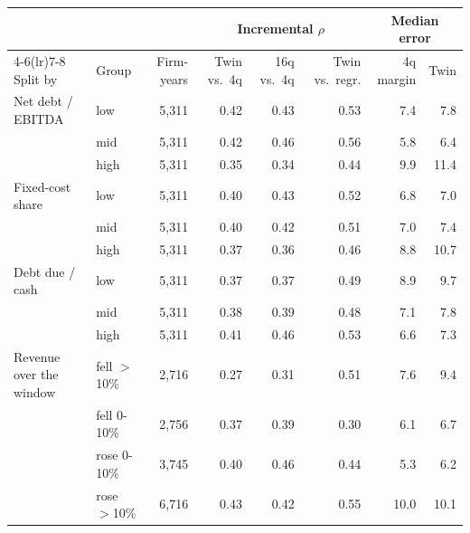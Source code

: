 \begin{tabular}{llrrrrrr}
\toprule
 & & & \multicolumn{3}{c}{Incremental $\rho$} & \multicolumn{2}{c}{Median error} \\
\cmidrule(lr){4-6}\cmidrule(lr){7-8}
Split by & Group & Firm-years & Twin vs.\ 4q & 16q vs.\ 4q & Twin vs.\ regr. & 4q margin & Twin \\
\midrule
Net debt / EBITDA & low & 5{,}311 & 0.42 & 0.43 & 0.53 & 7.4 & 7.8 \\
 & mid & 5{,}311 & 0.42 & 0.46 & 0.56 & 5.8 & 6.4 \\
 & high & 5{,}311 & 0.35 & 0.34 & 0.44 & 9.9 & 11.4 \\
\addlinespace
Fixed-cost share & low & 5{,}311 & 0.40 & 0.43 & 0.52 & 6.8 & 7.0 \\
 & mid & 5{,}311 & 0.40 & 0.42 & 0.51 & 7.0 & 7.4 \\
 & high & 5{,}311 & 0.37 & 0.36 & 0.46 & 8.8 & 10.7 \\
\addlinespace
Debt due / cash & low & 5{,}311 & 0.37 & 0.37 & 0.49 & 8.9 & 9.7 \\
 & mid & 5{,}311 & 0.38 & 0.39 & 0.48 & 7.1 & 7.8 \\
 & high & 5{,}311 & 0.41 & 0.46 & 0.53 & 6.6 & 7.3 \\
\addlinespace
Revenue over the window & fell $>$10\% & 2{,}716 & 0.27 & 0.31 & 0.51 & 7.6 & 9.4 \\
 & fell 0-10\% & 2{,}756 & 0.37 & 0.39 & 0.30 & 6.1 & 6.7 \\
 & rose 0-10\% & 3{,}745 & 0.40 & 0.46 & 0.44 & 5.3 & 6.2 \\
 & rose $>$10\% & 6{,}716 & 0.43 & 0.42 & 0.55 & 10.0 & 10.1 \\
\bottomrule
\end{tabular}
